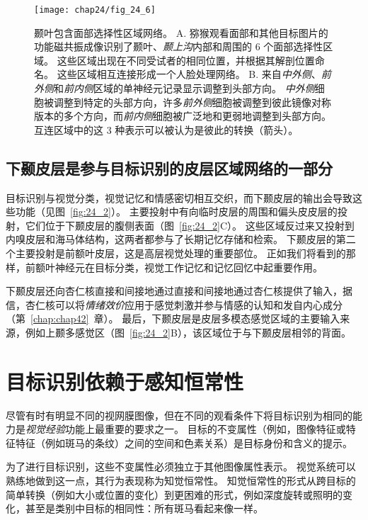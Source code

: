\begin{figure}[htbp]
	\centering
	\texttt{[image: chap24/fig\_24\_6]}
	\caption{颞叶包含面部选择性区域网络。
		A. 猕猴观看面部和其他目标图片的功能磁共振成像识别了颞叶、\textit{颞上沟}内部和周围的 6 个面部选择性区域。
		这些区域出现在不同受试者的相同位置，并根据其解剖位置命名。
		这些区域相互连接形成一个人脸处理网络。
		B. 来自\textit{中外侧}、\textit{前外侧}和\textit{前内侧}区域的单神经元记录显示调整到头部方向。
		\textit{中外侧}细胞被调整到特定的头部方向，许多\textit{前外侧}细胞被调整到彼此镜像对称版本的多个方向，而\textit{前内侧}细胞被广泛地和更弱地调整到头部方向。
		互连区域中的这 3 种表示可以被认为是彼此的转换（箭头）。}
	\label{fig:24_6}
\end{figure}



\subsection{下颞皮层是参与目标识别的皮层区域网络的一部分}

目标识别与视觉分类，视觉记忆和情感密切相互交织，而下颞皮层的输出会导致这些功能（见图~\ref{fig:24_2}）。
主要投射中有向临时皮层的周围和偏头皮皮层的投射，它们位于下颞皮层的腹侧表面（图~\ref{fig:24_2}C）。
这些区域反过来又投射到内嗅皮层和海马体结构，这两者都参与了长期记忆存储和检索。
下颞皮层的第二个主要投射是前额叶皮层，这是高层视觉处理的重要部位。
正如我们将看到的那样，前额叶神经元在目标分类，视觉工作记忆和记忆回忆中起重要作用。


下颞皮层还向杏仁核直接和间接地通过直接和间接地通过杏仁核提供了输入，据信，杏仁核可以将\textit{情绪效价}应用于感觉刺激并参与情感的认知和发自内心成分（第~\ref{chap:chap42}~章）。
最后，下颞皮层是皮层多模态感觉区域的主要输入来源，例如上颞多感觉区（图~\ref{fig:24_2}B），该区域位于与下颞皮层相邻的背面。



\section{目标识别依赖于感知恒常性}

尽管有时有明显不同的视网膜图像，但在不同的观看条件下将目标识别为相同的能力是\textit{视觉经验}功能上最重要的要求之一。
目标的不变属性（例如，图像特征或特征特征（例如斑马的条纹）之间的空间和色素关系）是目标身份和含义的提示。


为了进行目标识别，这些不变属性必须独立于其他图像属性表示。
视觉系统可以熟练地做到这一点，其行为表现称为知觉恒常性。
知觉恒常性的形式从跨目标的简单转换（例如大小或位置的变化）到更困难的形式，例如深度旋转或照明的变化，甚至是类别中目标的相同性：所有斑马看起来像一样。



